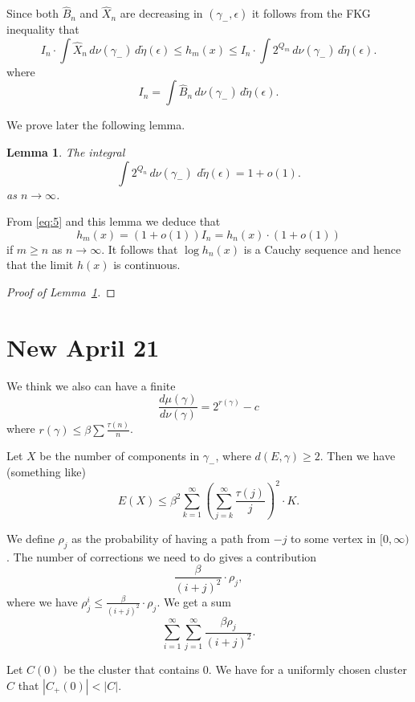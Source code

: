 \documentclass[11pt, a4paper, oneside]{scrartcl}
\newtheorem{lemma}[thm]{Lemma}
\theoremstyle{definition}
\theoremstyle{remark}
\renewcommand{\d}{\,d}
\providecommand{\ordo}[1]{{o(#1)}}
\providecommand{\e}{\epsilon}
\providecommand{\tl}{\tilde}
\providecommand{\g}{\gamma}
\begin{document}
Since both $\hat B_n$ and $\hat X_n$ are decreasing in $(\g_-,\e)$ it follows
from the FKG inequality that
\begin{equation}
  \label{eq:5}
  I_n \cdot \int \hat X_n \d\nu(\g_-) \d\tl\eta(\e) \le h_m(x) \le I_n \cdot \int 2^{Q_m} \d\nu(\g_-) \d\tl\eta(\e).
\end{equation}
where
\begin{equation}
  \label{eq:6}
  I_n = \int \hat B_n \d\nu(\g_-) \d\tl\eta(\e).
\end{equation}

We prove later the following lemma.
\begin{lemma}\label{lem:qn}
  The integral
  \[
    \int 2^{Q_n} \d\nu(\g_-)\, \d\tilde\eta(\e) = 1+\ordo{1}.
  \]
  as $n\to\infty$.
\end{lemma}
From \eqref{eq:5} and this lemma we deduce that
\begin{equation}
  \label{eq:2}
  h_m(x) = (1+\ordo1) I_n = h_n(x) \cdot (1+\ordo1)
\end{equation}
if $m\ge n$ as $n\to\infty$. It follows that $\log h_n(x)$ is a Cauchy sequence
and hence that the limit $h(x)$ is continuous.


\begin{proof}[Proof of Lemma~\ref{lem:qn}]

\end{proof}


\section{New April 21}

We think we also can have a finite 
$$\frac{d\mu(\gamma)}{d\nu(\gamma)}= 2^{r(\gamma)}-c$$
where $r(\gamma)\leq \beta \sum \frac{\tau (n)}{n}$.

Let $X$ be the number of components in $\gamma_{-}$, where $d(E,\gamma)\geq 2$.
Then we have (something like)
$$E(X)\leq \beta^2 \sum_{k=1}^\infty\left(\sum_{j=k}^\infty \frac{\tau(j)}{j}\right)^2\cdot K.$$

We define $\rho_j$ as the probability of having a path from $-j$ to some vertex
in $[0,\infty)$. The number of corrections we need to do gives a contribution
$$\frac{\beta}{(i+j)^2}\cdot \rho_j,$$
where we have $\rho_j^{i}\leq \frac{\beta}{(i+j)^2} \cdot \rho_j$. We get a sum
$$\sum_{i=1}^\infty \sum_{j=1}^\infty \frac{\beta \rho_j}{(i+j)^2}.$$ 

Let $C(0)$ be the cluster that contains $0$. We have for a uniformly chosen
cluster $C$ that $|C_+(0)|<|C|$.
\end{document}
